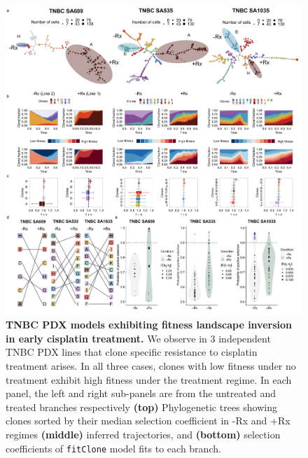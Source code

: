 \begin{figure}
\centering
\includegraphics[width=\textwidth]{Figures/chap4/landscapefitness.png}
	
\caption[Fitness landscape reversal in early cisplatin treatment in TNBC PDX models.]
	{\small
	\textbf{TNBC PDX models exhibiting fitness landscape inversion in early cisplatin treatment.}
	     We observe in 3 independent TNBC PDX lines that clone specific resistance to cisplatin treatment arises. In all three cases, clones with low fitness under no treatment exhibit high fitness under the treatment regime. In each panel, the left and right sub-panels are from the untreated and treated branches respectively \textbf{(top)} Phylogenetic trees showing clones sorted by their median selection coefficient in -Rx and +Rx regimes  \textbf{(middle)} inferred trajectories, and  \textbf{(bottom)} selection coefficients of \texttt{fitClone} model fits to each branch.
	}
	\label{fig:landscapefitness}
\end{figure}


